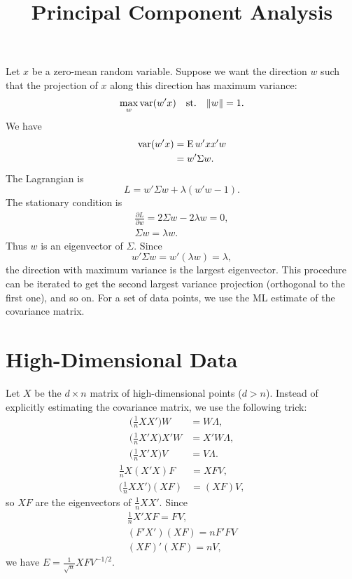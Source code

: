 \documentclass{article}
\title{\sc Principal Component Analysis}
\begin{document}
\maketitle

Let $x$ be a zero-mean random variable.  Suppose we want the direction $w$ such that the projection of $x$ along this direction has maximum variance:
\begin{equation}
\max_w \operatorname{var}(w'x) \quad \text{st.} \quad \lVert w \rVert=1.
\end{equation}
We have
\begin{align}
\operatorname{var}(w'x) & = \operatorname{E} w'xx'w \\
& = w' \Sigma w.
\end{align}
The Lagrangian is
\begin{equation}
L = w' \Sigma w + \lambda (w'w-1).
\end{equation}
The stationary condition is
\begin{align}
\frac{\partial L}{\partial w} = 2\Sigma w - 2\lambda w = 0, \\
\Sigma w = \lambda w.
\end{align}
Thus $w$ is an eigenvector of $\Sigma$.  Since
\begin{equation}
w' \Sigma w = w' (\lambda w) = \lambda,
\end{equation}
the direction with maximum variance is the largest eigenvector.  This procedure can be iterated to get the second largest variance projection (orthogonal to the first one), and so on.  For a set of data points, we use the ML estimate of the covariance matrix.

\section{High-Dimensional Data}

Let $X$ be the $d{\times}n$ matrix of high-dimensional points ($d > n$). Instead of explicitly estimating the covariance matrix, we use the following trick:
\begin{align}
\Big( \frac{1}{n} XX' \Big) W & = W\Lambda, \\
\Big( \frac{1}{n} X'X \Big) X'W & = X'W\Lambda, \\
\Big( \frac{1}{n} X'X \Big) V & = V\Lambda.
\end{align}
\begin{align}
\frac{1}{n} X(X'X)F & = XFV, \\
\Big( \frac{1}{n} XX' \Big) (XF) & = (XF)V,
\end{align}
so $XF$ are the eigenvectors of $\frac{1}{n} XX'$.  Since
\begin{align}
\frac{1}{n} X'XF = FV, \\
(F'X')(XF) = nF'FV \\
(XF)'(XF) = nV,
\end{align}
we have $E = \frac{1}{\sqrt{n}} XFV^{-1/2}$.
\end{document}
